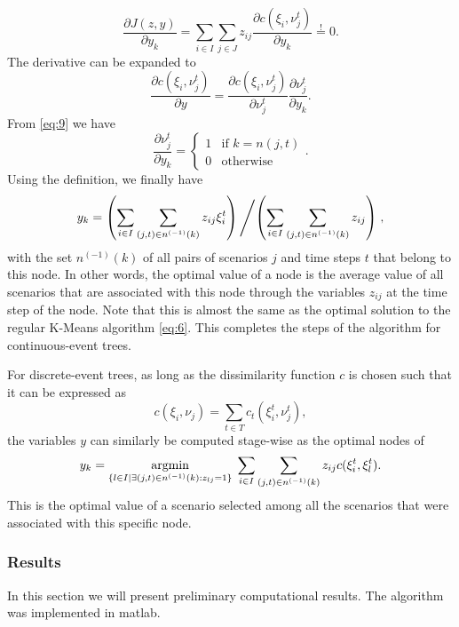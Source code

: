 \begin{equation}
  \label{eq:12}
  \frac{\partial J(z,y)}{\partial y_k} = \sum_{i\in I}\sum_{j\in J}z_{ij}\frac{\partial c(\xi_i, \nu_j^t)}{\partial y_k}\overset{!}{=} 0.
\end{equation}
The derivative can be expanded to
\begin{equation}
  \label{eq:13}
  \frac{\partial c(\xi_i, \nu_j^t)}{\partial y} = \frac{\partial c(\xi_i, \nu_j^t)}{\partial \nu_j^t}\frac{\partial \nu_j^t}{\partial y_k}.
\end{equation}
From \eqref{eq:9} we have
\begin{equation}
  \label{eq:14}
  \frac{\partial \nu_j^t}{\partial y_k} = 
  \left\{
    \begin{array}{ll}
      1&\text{if } k = n(j,t)\\0&\text{otherwise}
    \end{array}
  \right. .
\end{equation}
Using the definition, we finally have 
\begin{align}
  \label{eq:15}
  y_k = \left(\sum_{i\in I}\sum_{(j,t)\in n^{(-1)}(k)}z_{ij}\xi_i^t \right) \left / \left(\sum_{i\in I}\sum_{(j,t)\in n^{(-1)}(k)}z_{ij}\right)\right. ,
\end{align}
with the set $n^{(-1)}(k)$ of all pairs of scenarios $j$ and time steps $t$ that belong to this node.
In other words, the optimal value of a node is the average value of all scenarios that are associated with this node through the variables $z_{ij}$ at the time step of the node.
Note that this is almost the same as the optimal solution to the regular K-Means algorithm \eqref{eq:6}.
This completes the steps of the algorithm for continuous-event trees.

For discrete-event trees, as long as the dissimilarity function $c$ is chosen such that it can be expressed as 
\begin{equation}
  \label{eq:16}
  c(\xi_i, \nu_j) = \sum_{t\in T}c_t(\xi_i^t,\nu_j^t),
\end{equation}
the variables $y$ can similarly be computed stage-wise as the optimal nodes of 
\begin{equation}
  \label{eq:17}
  y_k = \underset{\{l\in I|\exists (j,t)\in n^{(-1)}(k):z_{lj}=1\} }{\operatorname{argmin}}\; \sum_{i\in I}\sum_{(j,t)\in n^{(-1)}(k)}z_{ij}c(\xi_i^t, \xi_l^t).
\end{equation}
This is the optimal value of a scenario selected among all the scenarios that were associated with this specific node.
\subsubsection{Results}
\label{sec:kmeans-results}
In this section we will present preliminary computational results. The algorithm was implemented in {\sc matlab}.

